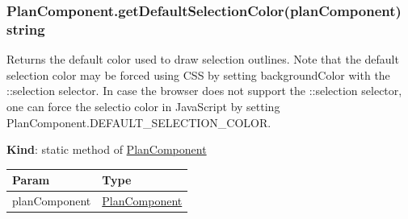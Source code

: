 \documentclass[a4paper]{report}
\begin{document}
\hypertarget{plancomponent.getdefaultselectioncolorplancomponent-string}{%
\subsubsection{PlanComponent.getDefaultSelectionColor(planComponent) 
string}\label{plancomponent.getdefaultselectioncolorplancomponent-string}}

Returns the default color used to draw selection outlines. Note that the
default selection color may be forced using CSS by setting
backgroundColor with the ::selection selector. In case the browser does
not support the ::selection selector, one can force the selectio color
in JavaScript by setting PlanComponent.DEFAULT\_SELECTION\_COLOR.

\textbf{Kind}: static method of
\protect\hyperlink{PlanComponent}{PlanComponent}

\begin{longtable}[]{@{}ll@{}}
\toprule
Param & Type\tabularnewline
\midrule
\endhead
planComponent &
\protect\hyperlink{PlanComponent}{PlanComponent}\tabularnewline
\bottomrule
\end{longtable}


        
\end{document}
